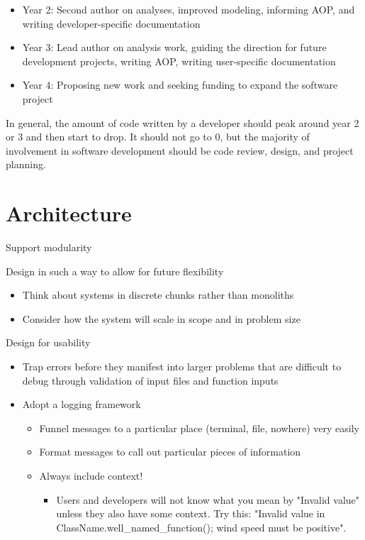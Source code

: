 \documentclass[]{nrel}
\begin{document}
\begin{appendices}
\begin{itemize}
\item Year 2: Second author on analyses, improved modeling, informing AOP, and writing developer-specific documentation

\item Year 3: Lead author on analysis work, guiding the direction for future development projects, writing AOP, writing user-specific documentation

\item Year 4: Proposing new work and seeking funding to expand the software project

\end{itemize}

In general, the amount of code written by a developer should peak around year 2 or 3 and
then start to drop.
It should not go to 0, but the majority of involvement in software development should be code
review, design, and project planning.




\section{Architecture}
Support modularity

Design in such a way to allow for future flexibility
\begin{itemize}
\item Think about systems in discrete chunks rather than monoliths

\item Consider how the system will scale in scope and in problem size

\end{itemize}

Design for usability
\begin{itemize}
\item Trap errors before they manifest into larger problems that are difficult to debug through
validation of input files and function inputs

\item Adopt a logging framework
\begin{itemize}
\item Funnel messages to a particular place (terminal, file, nowhere) very easily

\item Format messages to call out particular pieces of information

\item Always include context!
\begin{itemize}
\item Users and developers will not know what you mean by "Invalid value"
unless they also have some context. Try this: "Invalid value in
ClassName.well\_named\_function(); wind speed must be positive".


\end{itemize}
\end{itemize}
\end{itemize}
\end{appendices}
\end{document}

